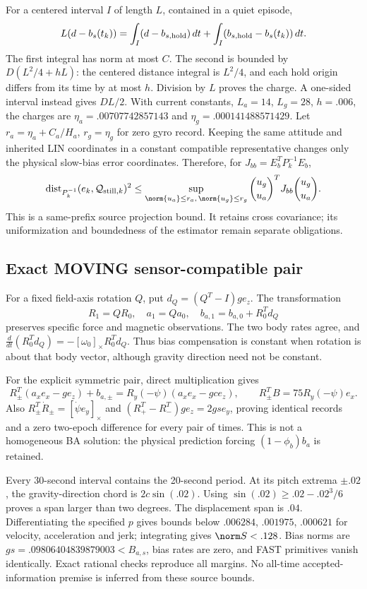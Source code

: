 For a centered interval \(I\) of length \(L\), contained in a quiet episode,
\[
L(d-b_s(t_k))=\int_I(d-b_{s,\rm hold})\,dt
 +\int_I(b_{s,\rm hold}-b_s(t_k))\,dt.
\]
The first integral has norm at most \(C\). The second is bounded by
\(D(L^2/4+hL)\): the centered distance integral is \(L^2/4\), and each hold
origin differs from its time by at most \(h\). Division by \(L\) proves the
charge. A one-sided interval instead gives \(DL/2\). With current constants,
\(L_a=14\), \(L_g=28\), \(h=.006\), the charges are
\(\eta_a=.00707742857143\) and \(\eta_g=.000141488571429\).
Let \(r_a=\eta_a+C_a/H_a\), \(r_g=\eta_g\) for zero gyro record.
Keeping the same attitude and inherited LIN coordinates in a constant compatible
representative changes only the physical slow-bias error coordinates. Therefore,
for \(J_{bb}=E_b^TP_k^{-1}E_b\),
\[
\operatorname{dist}_{P_k^{-1}}(e_k,\mathcal Q_{{\rm still},k})^2
\le\sup_{\norm{u_a}\le r_a,\,\norm{u_g}\le r_g}
\binom{u_g}{u_a}^{T}J_{bb}\binom{u_g}{u_a}.
\]
This is a same-prefix source projection bound. It retains cross covariance;
its uniformization and boundedness of the estimator remain separate obligations.

\subsection{Exact MOVING sensor-compatible pair}
For a fixed field-axis rotation \(Q\), put \(d_Q=(Q^T-I)ge_z\).
The transformation
\[
R_1=QR_0,\quad a_1=Qa_0,\quad
b_{a,1}=b_{a,0}+R_0^Td_Q
\]
preserves specific force and magnetic observations. The two body rates agree,
and \(\frac{d}{dt}(R_0^Td_Q)=-[\omega_0]_\times R_0^Td_Q\).
Thus bias compensation is constant when rotation is about that body vector,
although gravity direction need not be constant.

For the explicit symmetric pair, direct multiplication gives
\[
R_\pm^T(a_xe_x-ge_z)+b_{a,\pm}
=R_y(-\psi)(a_xe_x-gce_z),\qquad R_\pm^TB=75R_y(-\psi)e_x.
\]
Also \(R_\pm^T\dot R_\pm=[\dot\psi e_y]_\times\) and
\((R_+^T-R_-^T)ge_z=2gs e_y\), proving identical records and a zero
two-epoch difference for every pair of times. This is not a homogeneous BA
solution: the physical prediction forcing \((1-\phi_b)b_a\) is retained.

Every 30-second interval contains the 20-second period. At its pitch extrema
\(\pm.02\), the gravity-direction chord is \(2c\sin(.02)\).
Using \(\sin(.02)\ge.02-.02^3/6\) proves a span larger than two degrees.
The displacement span is \(.04\). Differentiating the specified \(p\) gives
bounds below \(.006284\), \(.001975\), \(.000621\) for velocity,
acceleration and jerk; integrating gives \(\norm S<.128\).
Bias norms are \(gs=.09806404839879003<B_{a,s}\), bias rates are zero, and
FAST primitives vanish identically. Exact rational checks reproduce all margins.
No all-time accepted-information premise is inferred from these source bounds.

